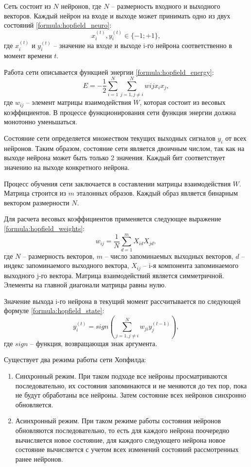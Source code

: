Сеть состоит из $N$ нейронов, где $N$ -- размерность входного и выходного векторов.
Каждый нейрон на входе и выходе может принимать одно из двух состояний \ref{formula:hopfield_neuro}:
\begin{equation}\label{formula:hopfield_neuro}
	x_i^{(t)}, y_i^{(t)} \in \{-1; +1\},
\end{equation}
где $x_i^{(t)}$ и $y_i^{(t)}$ -- значение на входе и выходе i-го нейрона соответственно в момент времени $t$.

Работа сети описывается функцией энергии \ref{formula:hopfield_energy}:
\begin{equation}\label{formula:hopfield_energy}
	E = -\frac{1}{2}\sum\limits_{i=1}^{N}\sum\limits_{j=1,j\neq i}^{N}w{ij}x_i x_j,
\end{equation}
где $w_{ij}$ -- элемент матрицы взаимодействия $W$, которая состоит из весовых коэффициентов.
В процессе функционирования сети функция энергии должна монотонно уменьшаться.

Состояние сети определяется множеством текущих выходных сигналов $y_i$ от всех нейронов.
Таким образом, состояние сети является двоичным числом, так как на выходе нейрона может быть только 2 значения.
Каждый бит соответствует значению на выходе конкретного нейрона.

Процесс обучения сети заключается в составлении матрицы взаимодействия $W$.
Матрица строится из $m$ эталонных образов.
Каждый образ является бинарным вектором размерности $N$.

Для расчета весовых коэффициентов применяется следующее выражение \ref{formula:hopfield_weights}:
\begin{equation}\label{formula:hopfield_weights}
	w_{ij} = \frac{1}{N}\sum\limits_{d=1}^{m}X_{id}X_{jd},
\end{equation}
где $N$ -- размерность векторов, $m$ -- число запоминаемых выходных векторов, $d$ -- индекс запоминаемого выходного вектора, $X_{ij}$ -- i-я компонента запоминаемого выходного j-го вектора.
Матрица взаимодействий является симметричной.
Элементы на главной диагонали матрицы равны нулю.

Значение выхода i-го нейрона в текущий момент рассчитывается по следующей формуле \ref{formula:hopfield_state}:
\begin{equation}\label{formula:hopfield_state}
	y_i^{(t)} = sign(\sum\limits_{j=1, j \neq i}^{N}w_{ji}y_j^{(t-1)}),
\end{equation}
где $sign$ -- функция, возвращающая знак аргумента.

Существует два режима работы сети Хопфилда:
\begin{enumerate}
	\item Синхронный режим. При таком подходе все нейроны просматриваются последовательно, их состояния запоминаются и не меняются до тех пор, пока не будут обработаны все нейроны. Затем состояние всех нейронов синхронно обновляется.
	\item Асинхронный режим. При таком режиме работы состояния нейронов обновляются последовательно, то есть для каждого нейрона поочередно вычисляется новое состояние, для каждого следующего нейрона новое состояние вычисляется с учетом всех изменений состояний рассмотренных ранее нейронов.
\end{enumerate}

